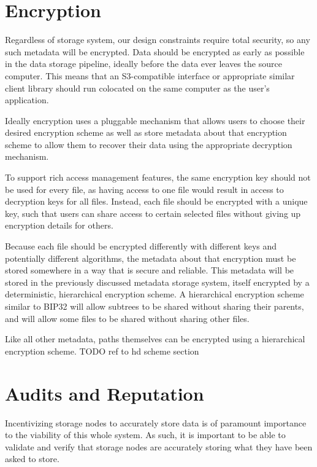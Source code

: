 \documentclass[11pt,fleqn,openany]{book}
\newcommand{\todo}[1]{{\color{red} TODO #1 }}
\begin{document}
\section{Encryption}

Regardless of storage system, our design constraints require total security,
so any such metadata will be encrypted.
Data should be encrypted as early as possible in the data storage pipeline,
ideally before the data ever leaves the source computer. This means that an
S3-compatible interface or appropriate similar client library should run
colocated on the same computer as the user's application.

Ideally encryption uses a pluggable mechanism that allows users to choose their
desired encryption scheme as well as store metadata about that encryption
scheme to allow them to recover their data using the appropriate decryption
mechanism.

To support rich access management features, the same encryption key should not
be used for every file, as having access to one file would result in access
to decryption keys for all files. Instead, each file should be encrypted with
a unique key, such that users can share access to certain selected files
without giving up encryption details for others.

Because each file should be encrypted differently with different keys and
potentially different algorithms, the metadata about that encryption must
be stored somewhere in a way that is secure and reliable. This metadata will
be stored in the previously discussed metadata storage system, itself encrypted
by a deterministic, hierarchical encryption scheme.
A hierarchical encryption scheme similar to
BIP32 \cite{bip32} will allow subtrees to be shared without sharing their
parents, and will allow some files to be shared without sharing other files.

Like all other metadata, paths themselves can be encrypted using a hierarchical
encryption scheme. \todo{ref to hd scheme section}

\section{Audits and Reputation}

Incentivizing storage nodes to accurately store data is of paramount importance
to
the viability of this whole system. As such, it is important to be able to
validate and verify that storage nodes are accurately storing what they have
been
asked to store.
\end{document}
